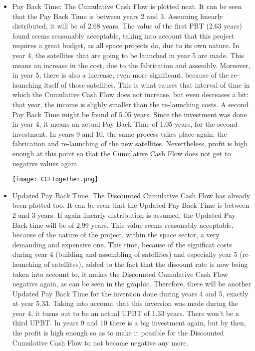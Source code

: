 \begin{itemize}
\item Pay Back Time: The Cumulative Cash Flow is plotted next. It can be seen that the Pay Back Time is between years 2 and 3. Assuming linearly distributed, it will be of 2.68 years. The value of the first PBT (2.63 years) found seems reasonably acceptable, taking into account that this project requires a great budget, as all space projects do, due to its own nature. In year 4, the satellites that are going to be launched in year 5 are made. This means an increase in the cost, due to the fabrication and assembly. Moreover, in year 5, there is also a increase, even more significant, because of the re-launching itself of those satellites. This is what causes that interval of time in which the Cumulative Cash Flow does not increase, but even decreases a bit: that year, the income is slighly smaller than the re-launching costs. A second Pay Back Time might be found of 5.05 years. Since the investment was done in year 4, it means an actual Pay Back Time of 1.05 years, for the second investment. In years 9 and 10, the same process takes place again: the fabrication and re-launching of the new satellites. Nevertheless, profit is high enough at this point so that the Cumulative Cash Flow does not get to negative values again.

\texttt{[image: CCFTogether.png]}


\item Updated Pay Back Time. The Discounted Cumulative Cash Flow has already been plotted too. It can be seen that the Updated Pay Back Time is between 2 and 3 years. If again linearly distribution is assumed, the Updated Pay Back time will be of 2.99 years. This value seems reasonably acceptable, because of the nature of the project, within the space sector, a very demanding and expensive one.
This time, because of the significat costs during year 4 (building and assembling of satellites) and especially year 5 (re-launching of satellites), added to the fact that the discount rate is now being taken into account to, it makes the Discounted Cumulative Cash Flow negative again, as can be seen in the graphic. Therefore, there will be another Updated Pay Back Time for the inversion done during years 4 and 5, exactly at year 5.33. Taking into account that this inversion was made during the year 4, it turns out to be an actual UPBT of 1.33 years. There won't be a third UPBT. In years 9 and 10 there is a big investment again, but by then, the profit is high enough so as to make it possible for the Discounted Cumulative Cash Flow to not become negative any more. 



\end{itemize}
